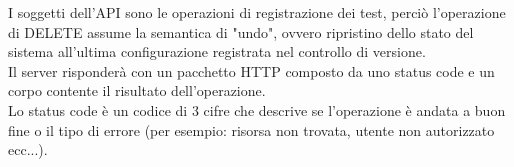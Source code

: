         I soggetti dell'API sono le operazioni di registrazione dei test, perciò l'operazione di DELETE assume la semantica di "undo", ovvero ripristino dello stato del sistema all'ultima configurazione registrata nel controllo di versione.\\
        
        Il server risponderà con un pacchetto HTTP composto da uno status code e un corpo contente il risultato dell'operazione.\\
        Lo status code è un codice di 3 cifre che descrive se l'operazione è andata a buon fine o il tipo di errore (per esempio: risorsa non trovata, utente non autorizzato ecc...).\\
        